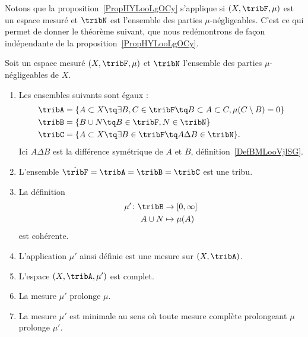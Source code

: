 Notons que la proposition~\ref{PropHYLooLgOCy} s'applique si \( (X,\tribF,\mu)\) est un espace mesuré et \( \tribN\) est l'ensemble des parties \( \mu\)-négligeables. C'est ce qui permet de donner le théorème suivant, que nous redémontrons de façon indépendante de la proposition~\ref{PropHYLooLgOCy}.
\begin{theorem}   \label{thoCRMootPojn}
	Soit un espace mesuré \( (X,\tribF,\mu)\) et \( \tribN\) l'ensemble des parties \( \mu\)-négligeables de \( X\).
	\begin{enumerate}
		\item
		      Les ensembles suivants sont égaux :
		      \begin{subequations}
			      \begin{align}
				      \tribA & =\{ A\subset X \tq \exists B,C\in\tribF \tq B\subset A\subset C,\mu(C\setminus B)=0 \} \\
				      \tribB & =\{ B\cup N \tq  B\in\tribF,N\in\tribN \}          \label{EqFJIoorxZNU}                \\
				      \tribC & =\{ A\subset X\tq \exists B\in\tribF\tq A\Delta B\in \tribN \}.
			      \end{align}
		      \end{subequations}
		      Ici \( A\Delta B\) est la différence symétrique de \( A\) et \( B\), définition~\ref{DefBMLooVjlSG}.
		\item
		      L'ensemble \( \hat\tribF=\tribA=\tribB=\tribC\) est une tribu.
		\item
		      La définition
		      \begin{equation}
			      \begin{aligned}
				      \mu'\colon \tribB & \to \mathopen[ 0 , \infty \mathclose] \\
				      A\cup N           & \mapsto \mu(A)
			      \end{aligned}
		      \end{equation}
		      est cohérente.
		\item
		      L'application \( \mu'\) ainsi définie est une mesure sur \( (X,\tribA)\).
		\item
		      L'espace \( (X,\tribA,\mu')\) est complet.
		\item
		      La mesure \( \mu'\) prolonge \( \mu\).
		\item   \label{thoCRMootPojnvii}
		      La mesure \( \mu'\) est minimale au sens où toute mesure complète prolongeant \( \mu\) prolonge \( \mu'\).
	\end{enumerate}
\end{theorem}

